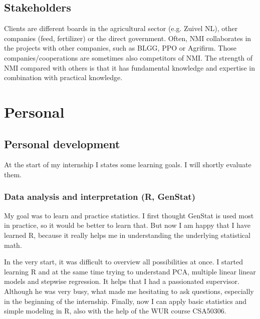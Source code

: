 \documentclass[10pt,twoside,dutch,english]{report}
\begin{document}
\subsection{Stakeholders}
Clients are different boards in the agricultural sector (e.g. Zuivel NL), other companies (feed, fertilizer) or the direct government. Often, NMI collaborates in the projects with other companies, such as BLGG, PPO or Agrifirm.  
Those companies/cooperations are sometimes also competitors of NMI. The strength of NMI compared with others is that it has fundamental knowledge and expertise in combination with practical knowledge.  


\section{Personal}

\subsection{Personal development}
At the start of my internship I states some learning goals. I will shortly evaluate them.

\subsubsection{Data analysis and interpretation (R, GenStat) }
My goal was to learn and practice statistics. I first thought GenStat is used most in practice, so it would be better to learn that. But now I am happy that I have learned R, because it really helps me in understanding the underlying statistical math. 

In the very start, it was difficult to overview all possibilities at once. I started learning R and at the same time trying to understand PCA, multiple linear linear models and stepwise regression. It helps that I had a passionated supervisor. Although he was very busy, what made me hesitating to ask questions, especially in the beginning of the internship.
Finally, now I can apply basic statistics and simple modeling in R, also with the help of the WUR course CSA50306. 
\end{document}
